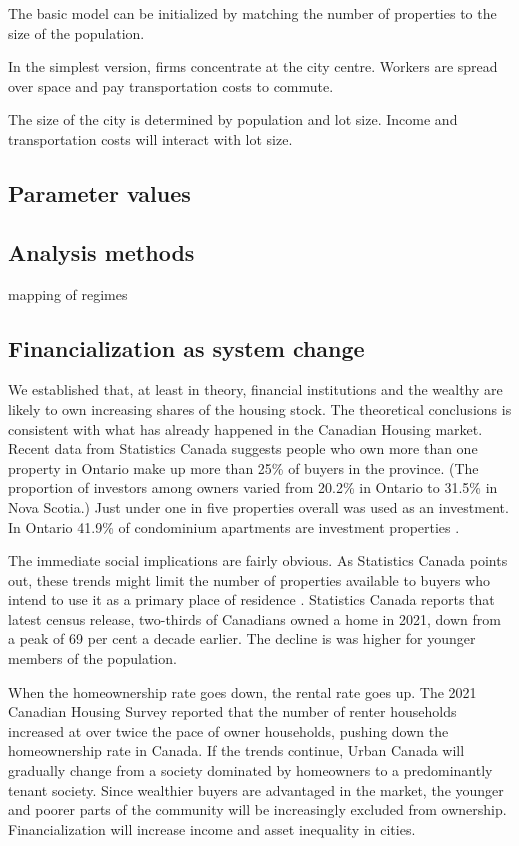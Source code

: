 The basic model can be initialized by matching the number of properties to the size of the population. 

In the simplest version, firms concentrate at the city centre. Workers are spread over space and pay transportation costs to commute.

The size of the city is determined by population and lot size. Income and transportation costs will interact with lot size. 

\subsection{Parameter values}

\subsection{Analysis methods}
mapping of regimes


\subsection{Financialization as system change} \label{section-system}
We established that, at least in theory, financial institutions and the wealthy are likely to own increasing shares of the housing stock. The theoretical conclusions is consistent with what has already happened in the Canadian Housing market. Recent data from Statistics Canada \cite{fontaineResidentialRealEstate2023} suggests people who own more than one property in Ontario make up more than 25\% of buyers in the province. (The proportion of investors among owners varied from 20.2\% in Ontario to 31.5\% in Nova Scotia.)
Just under one in five properties overall was used as an investment.
In Ontario 41.9\% of condominium apartments are investment properties \cite{statisticscanadaBuyRentHousing2022}.

The immediate social implications are fairly obvious. As Statistics Canada points out, these trends might limit the number of properties available to buyers who intend to use it as a primary place of residence  \cite{fontaineResidentialRealEstate2023}. Statistics Canada reports that latest census release, two-thirds of Canadians owned a home in 2021, down from a peak of 69 per cent a decade earlier. The decline is was higher for younger members of the population. 

When the homeownership rate goes down, the rental rate goes up. The 2021 Canadian Housing Survey reported that the number of renter households increased  at over twice the pace of owner households, pushing down the homeownership rate in Canada. If the trends continue, Urban Canada will gradually change from a society dominated by homeowners to a predominantly tenant society. Since wealthier buyers are advantaged in the market, the younger and poorer parts of the community will be increasingly excluded from ownership. Financialization will increase income and asset inequality in cities.

